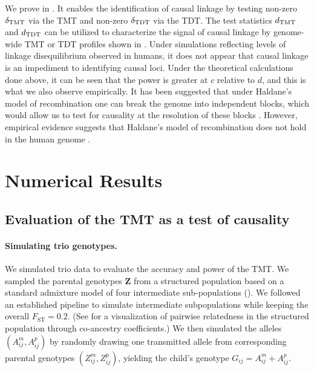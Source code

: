\documentclass[12pt]{extarticle}
\newcommand{\tmt}{{\normalfont \text{TMT}}}
\newcommand{\tdt}{{\normalfont \text{TDT}}}
\begin{document}
{\noindent We prove  in . It enables the identification of causal linkage by testing non-zero $\delta_{\tmt}$ via the TMT and non-zero $\delta_{\tdt}$ via the TDT. The test statistics $d_{\tmt}$ and $d_{\tdt}$ can be utilized to characterize the signal of causal linkage by genome-wide TMT or TDT profiles shown in . Under simulations reflecting levels of linkage disequilibrium observed in humans, it does not appear that causal linkage is an impediment to identifying causal loci. Under the theoretical calculations done above, it can be seen that the power is greater at $c$ relative to $d$, and this is what we also observe empirically. It has been suggested that under Haldane's model of recombination one can break the genome into independent blocks, which would allow us to test for causality at the resolution of these blocks \citep{bates2020}. However, empirical evidence suggests that Haldane's model of recombination does not hold in the human genome \citep{myers2005, coop2008, kivikoski2023}. %

\section{Numerical Results}

\subsection{Evaluation of the TMT as a test of causality} \label{sec:tmt_empirical}

\paragraph{Simulating trio genotypes.}

We simulated trio data to evaluate the accuracy and power of the TMT. We sampled the parental genotypes $\boldsymbol{Z}$ from a structured population based on a standard admixture model \citep{PSD2000, falush2003, ochoa2021} of four intermediate sub-populations (). We followed an established pipeline \citep{ochoa2021} to simulate intermediate subpopulations while keeping the overall $F_{\text{ST}} = 0.2$. (See  for a visualization of pairwise relatedness in the structured population through co-ancestry coefficients.) We then simulated the alleles $(A_{ij}^m,A_{ij}^p)$ by randomly drawing one transmitted allele from corresponding parental genotypes $(Z_{ij}^m,Z_{ij}^p)$, yielding the child's genotype $G_{ij}=A_{ij}^m+A_{ij}^p$.

}
\end{document}
